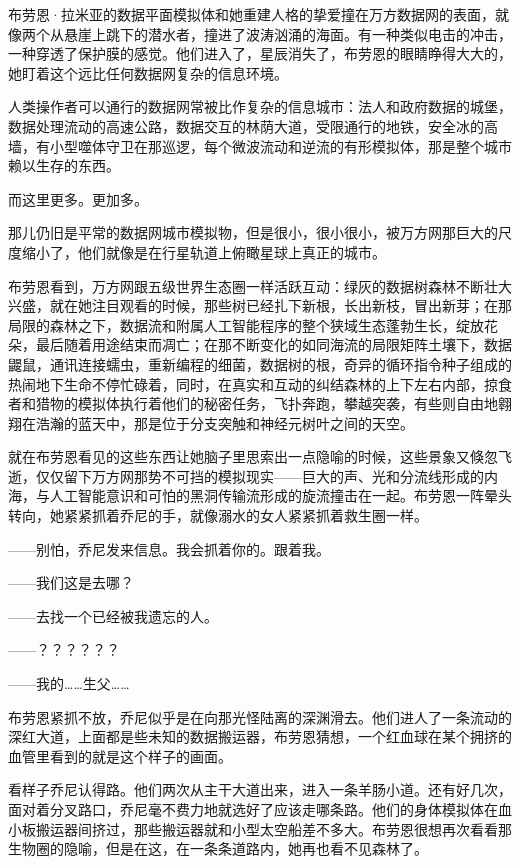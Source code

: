 \documentclass[AutoFakeBold=true]{book}
\begin{document}
布劳恩·拉米亚的数据平面模拟体和她重建人格的挚爱撞在万方数据网的表面，就像两个从悬崖上跳下的潜水者，撞进了波涛汹涌的海面。有一种类似电击的冲击，一种穿透了保护膜的感觉。他们进入了，星辰消失了，布劳恩的眼睛睁得大大的，她盯着这个远比任何数据网复杂的信息环境。

人类操作者可以通行的数据网常被比作复杂的信息城市：法人和政府数据的城堡，数据处理流动的高速公路，数据交互的林荫大道，受限通行的地铁，安全冰的高墙，有小型噬体守卫在那巡逻，每个微波流动和逆流的有形模拟体，那是整个城市赖以生存的东西。

而这里更多。更加多。

那儿仍旧是平常的数据网城市模拟物，但是很小，很小很小，被万方网那巨大的尺度缩小了，他们就像是在行星轨道上俯瞰星球上真正的城市。

布劳恩看到，万方网跟五级世界生态圈一样活跃互动：绿灰的数据树森林不断壮大兴盛，就在她注目观看的时候，那些树已经扎下新根，长出新枝，冒出新芽；在那局限的森林之下，数据流和附属人工智能程序的整个狭域生态蓬勃生长，绽放花朵，最后随着用途结束而凋亡；在那不断变化的如同海流的局限矩阵土壤下，数据鼹鼠，通讯连接蠕虫，重新编程的细菌，数据树的根，奇异的循环指令种子组成的热闹地下生命不停忙碌着，同时，在真实和互动的纠结森林的上下左右内部，掠食者和猎物的模拟体执行着他们的秘密任务，飞扑奔跑，攀越突袭，有些则自由地翱翔在浩瀚的蓝天中，那是位于分支突触和神经元树叶之间的天空。

就在布劳恩看见的这些东西让她脑子里思索出一点隐喻的时候，这些景象又倏忽飞逝，仅仅留下万方网那势不可挡的模拟现实——巨大的声、光和分流线形成的内海，与人工智能意识和可怕的黑洞传输流形成的旋流撞击在一起。布劳恩一阵晕头转向，她紧紧抓着乔尼的手，就像溺水的女人紧紧抓着救生圈一样。

{\kaishu ——别怕，}乔尼发来信息。{\kaishu 我会抓着你的。跟着我。}

{\kaishu ——我们这是去哪？}

{\kaishu ——去找一个已经被我遗忘的人。}

{\kaishu ——？？？？？？}

{\kaishu ——我的……生父……}

布劳恩紧抓不放，乔尼似乎是在向那光怪陆离的深渊滑去。他们进人了一条流动的深红大道，上面都是些未知的数据搬运器，布劳恩猜想，一个红血球在某个拥挤的血管里看到的就是这个样子的画面。

看样子乔尼认得路。他们两次从主干大道出来，进入一条羊肠小道。还有好几次，面对着分叉路口，乔尼毫不费力地就选好了应该走哪条路。他们的身体模拟体在血小板搬运器间挤过，那些搬运器就和小型太空船差不多大。布劳恩很想再次看看那生物圈的隐喻，但是在这，在一条条道路内，她再也看不见森林了。
\end{document}
